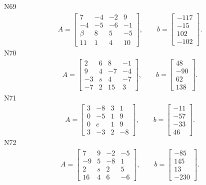 \documentclass[11pt]{report}
\begin{document}
N69
\begin{align*}
 A = \left[\begin{matrix}7 & -4 & -2 & 9\\-4 & -5 & -6 & -1\\\beta & 8 & 5 & -5\\11 & 1 & 4 & 10\end{matrix}\right],
\qquad b = \left[\begin{matrix}-117\\-15\\102\\-102\end{matrix}\right]. 
 \end{align*}
N70
\begin{align*}
 A = \left[\begin{matrix}2 & 6 & 8 & -1\\9 & 4 & -7 & -4\\-3 & s & 4 & -7\\-7 & 2 & 15 & 3\end{matrix}\right],
\qquad b = \left[\begin{matrix}48\\-90\\62\\138\end{matrix}\right]. 
 \end{align*}
N71
\begin{align*}
 A = \left[\begin{matrix}3 & -8 & 3 & 1\\0 & -5 & 1 & 9\\0 & c & 1 & 9\\3 & -3 & 2 & -8\end{matrix}\right],
\qquad b = \left[\begin{matrix}-11\\-57\\-33\\46\end{matrix}\right]. 
 \end{align*}
N72
\begin{align*}
 A = \left[\begin{matrix}7 & 9 & -2 & -5\\-9 & 5 & -8 & 1\\2 & s & 2 & 5\\16 & 4 & 6 & -6\end{matrix}\right],
\qquad b = \left[\begin{matrix}-85\\145\\13\\-230\end{matrix}\right]. 
 \end{align*}
\end{document}
